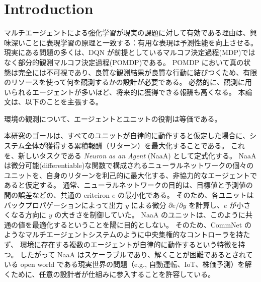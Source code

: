 \section{Introduction}

マルチエージェントによる強化学習が現実の課題に対して有効である理由は、興味深いことに表現学習の原理と一致する：有用な表現は予測性能を向上させる。
現実にある問題の多くは、DQN が前提としているマルコフ決定過程(MDP)ではなく部分的観測マルコフ決定過程(POMDP)である\citep[p.258]{sutton1998reinforcement}。
POMDP において真の状態は完全には不可視であり、良質な観測結果が良質な行動に結びつくため、有限のリソースを使って何を観測するかの設計が必要である。
必然的に、観測に用いられるエージェントが多いほど、将来的に獲得できる報酬も高くなる。
本論文は、以下のことを主張する。

\begin{center}
環境の観測について、エージェントとユニットの役割は等価である。
\end{center}


本研究のゴールは、すべてのユニットが自律的に動作すると仮定した場合に、システム全体が獲得する累積報酬（リターン）を最大化することである。
これを、新しいタスクである {\em Neuron as an Agent} (NaaA) として定式化する。
NaaA は微分可能(differentiable)な関数で構成されるニューラルネットワークの個々のユニットを、自身のリターンを利己的に最大化する、非協力的なエージェントであると仮定する。
通常、ニューラルネットワークの目的は、目標値と予測値の間の誤差などの、共通の criteiron $e$ の最小化である。
そのため、各ユニットはバックプロパゲーションによって出力 $y$ による微分 $\partial e / \partial y$ を計算し、$e$ が小さくなる方向に $y$ の大きさを制御していた。
NaaA のユニットは、このように共通の値を最適化するということを陽に目的としない。
そのため、CommNet \citep{sukhbaatar2016learning} のようなマルチエージェントシステムのように中央集権的なコントローラを持たず、
環境に存在する複数のエージェントが自律的に動作するという特徴を持つ。
したがって NaaA はスケーラブルであり、解くことが困難であるとされている open world である現実世界の問題（e.g., 自動運転、IoT、株価予測）を解くために、任意の設計者が仕組みに参入することを許容している。

